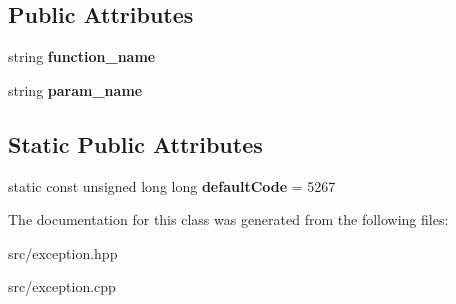 \subsection*{Public Attributes}
\begin{DoxyCompactItemize}
\item 
\mbox{\label{classDataJuggler_1_1InvalidArgsEx_ae5cf96c161a746440d9020a1e08ea064}} 
string {\bfseries function\+\_\+name}
\item 
\mbox{\label{classDataJuggler_1_1InvalidArgsEx_abae3048ec919313a22f58a5787e55c6f}} 
string {\bfseries param\+\_\+name}
\end{DoxyCompactItemize}
\subsection*{Static Public Attributes}
\begin{DoxyCompactItemize}
\item 
\mbox{\label{classDataJuggler_1_1InvalidArgsEx_a89a2a9b6d4da8c42d1d5511a4bc66890}} 
static const unsigned long long {\bfseries default\+Code} = 5267
\end{DoxyCompactItemize}


The documentation for this class was generated from the following files\+:\begin{DoxyCompactItemize}
\item 
src/exception.\+hpp\item 
src/exception.\+cpp\end{DoxyCompactItemize}
